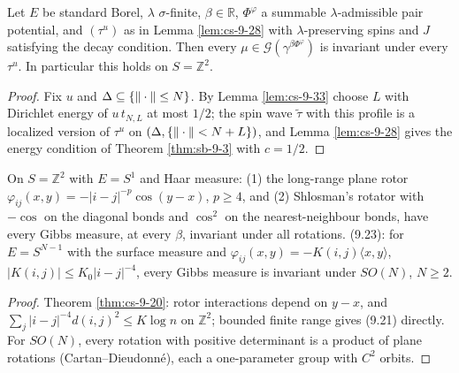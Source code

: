 \begin{theorem}
    \label{thm:cs-9-20}
    \leanok

    Let $E$ be standard Borel, $\lambda$ $\sigma$-finite, $\beta \in \mathbb R$, $\Phi^\varphi$
    a summable $\lambda$-admissible pair potential, and $(\tau^u)$ as in Lemma \ref{lem:cs-9-28}
    with $\lambda$-preserving spins and $J$ satisfying the decay condition. Then every
    $\mu \in \mathcal G(\gamma^{\beta\Phi^\varphi})$ is invariant under every $\tau^u$. In
    particular this holds on $S = \mathbb Z^2$.
\end{theorem}
\begin{proof}
    \leanok
    Fix $u$ and $\Delta \subseteq \left\{ \|\cdot\| \leq N \right\}$. By Lemma \ref{lem:cs-9-33} choose $L$
    with Dirichlet energy of $u\,t_{N,L}$ at most $1/2$; the spin wave $\tilde\tau$ with this
    profile is a localized version of $\tau^u$ on $(\Delta, \left\{ \|\cdot\| < N + L \right\})$, and Lemma
    \ref{lem:cs-9-28} gives the energy condition of Theorem \ref{thm:sb-9-3} with $c = 1/2$.
\end{proof}

\begin{example}
    \label{ex:cs-9-22}
    \leanok

    On $S = \mathbb Z^2$ with $E = S^1$ and Haar measure: (1) the long-range plane rotor
    $\varphi_{ij}(x, y) = -|i - j|^{-p}\cos(y - x)$, $p \geq 4$, and (2) Shlosman's rotator with
    $-\cos$ on the diagonal bonds and $\cos^2$ on the nearest-neighbour bonds, have every Gibbs
    measure, at every $\beta$, invariant under all rotations. (9.23): for $E = S^{N-1}$ with the
    surface measure and $\varphi_{ij}(x,y) = -K(i,j)\langle x, y\rangle$, $|K(i,j)| \leq
    K_0|i-j|^{-4}$, every Gibbs measure is invariant under $SO(N)$, $N \geq 2$.
\end{example}
\begin{proof}
    \leanok
    Theorem \ref{thm:cs-9-20}: rotor interactions depend on $y - x$, and $\sum_{j}|i-j|^{-4}
    d(i,j)^2 \leq K\log n$ on $\mathbb Z^2$; bounded finite range gives (9.21) directly. For
    $SO(N)$, every rotation with positive determinant is a product of plane rotations
    (Cartan--Dieudonn\'e), each a one-parameter group with $C^2$ orbits.
\end{proof}

